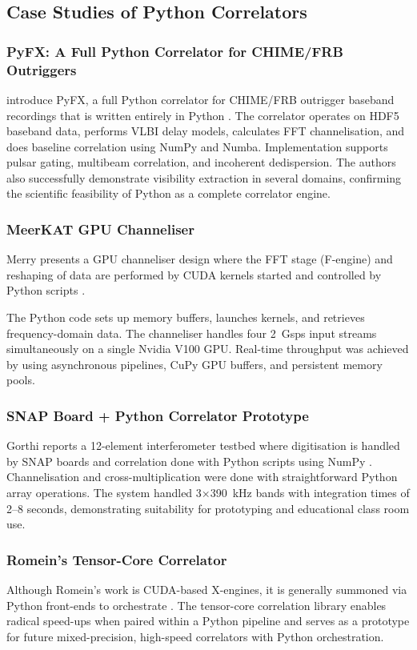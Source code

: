     \subsection{Case Studies of Python Correlators}
        \subsubsection{PyFX: A Full Python Correlator for CHIME/FRB Outriggers}
        \cite{Leung2024} introduce PyFX, a full Python correlator for CHIME/FRB outrigger baseband recordings that is written entirely in Python \cite{Leung2024}.  The correlator operates on HDF5 baseband data, performs VLBI delay models, calculates FFT channelisation, and does baseline correlation using NumPy and Numba. Implementation supports pulsar gating, multibeam correlation, and incoherent dedispersion. The authors also successfully demonstrate visibility extraction in several domains, confirming the scientific feasibility of Python as a complete correlator engine.
        
        \subsubsection{MeerKAT GPU Channeliser}
        Merry presents a GPU channeliser design where the FFT stage (F-engine) and reshaping of data are performed by CUDA kernels started and controlled by Python scripts \cite{Merry2023}.
        
        The Python code sets up memory buffers, launches kernels, and retrieves frequency-domain data. The channeliser handles four 2~Gsps input streams simultaneously on a single Nvidia V100 GPU. Real-time throughput was achieved by using asynchronous pipelines, CuPy GPU buffers, and persistent memory pools. 
        
        \subsubsection{SNAP Board + Python Correlator Prototype}
        Gorthi reports a 12-element interferometer testbed where digitisation is handled by SNAP boards and correlation done with Python scripts using NumPy \cite{Gorthi2021}. Channelisation and cross-multiplication were done with straightforward Python array operations. The system handled 3×390~kHz bands with integration times of 2–8 seconds, demonstrating suitability for prototyping and educational class room use.

        \subsubsection{Romein's Tensor-Core Correlator}
        Although Romein's work is CUDA-based X-engines, it is generally summoned via Python front-ends to orchestrate \cite{Romein2021}. The tensor-core correlation library enables radical speed-ups when paired within a Python pipeline and serves as a prototype for future mixed-precision, high-speed correlators with Python orchestration.

